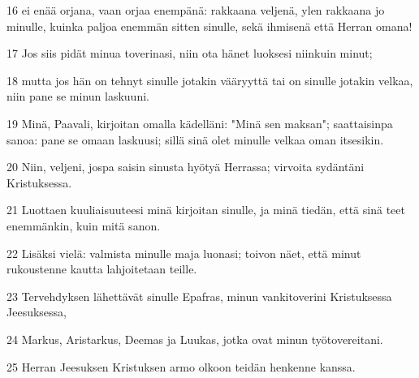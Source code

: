 \par 16 ei enää orjana, vaan orjaa enempänä: rakkaana veljenä, ylen rakkaana jo minulle, kuinka paljoa enemmän sitten sinulle, sekä ihmisenä että Herran omana!
\par 17 Jos siis pidät minua toverinasi, niin ota hänet luoksesi niinkuin minut;
\par 18 mutta jos hän on tehnyt sinulle jotakin vääryyttä tai on sinulle jotakin velkaa, niin pane se minun laskuuni.
\par 19 Minä, Paavali, kirjoitan omalla kädelläni: "Minä sen maksan"; saattaisinpa sanoa: pane se omaan laskuusi; sillä sinä olet minulle velkaa oman itsesikin.
\par 20 Niin, veljeni, jospa saisin sinusta hyötyä Herrassa; virvoita sydäntäni Kristuksessa.
\par 21 Luottaen kuuliaisuuteesi minä kirjoitan sinulle, ja minä tiedän, että sinä teet enemmänkin, kuin mitä sanon.
\par 22 Lisäksi vielä: valmista minulle maja luonasi; toivon näet, että minut rukoustenne kautta lahjoitetaan teille.
\par 23 Tervehdyksen lähettävät sinulle Epafras, minun vankitoverini Kristuksessa Jeesuksessa,
\par 24 Markus, Aristarkus, Deemas ja Luukas, jotka ovat minun työtovereitani.
\par 25 Herran Jeesuksen Kristuksen armo olkoon teidän henkenne kanssa.


